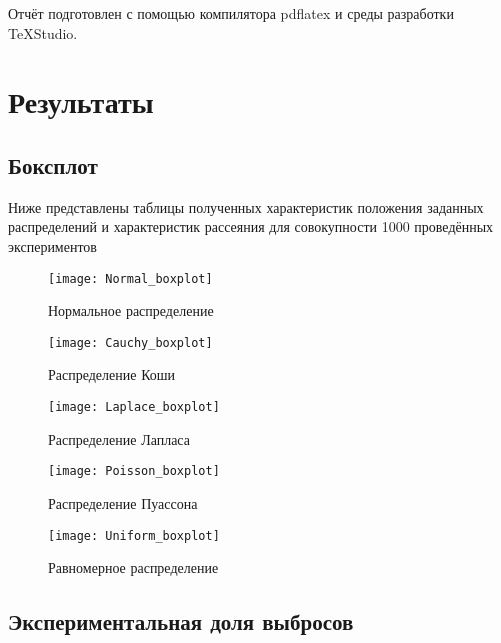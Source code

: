 Отчёт подготовлен с помощью компилятора pdflatex и среды разработки TeXStudio.

\section{Результаты}
\subsection{Боксплот}
Ниже представлены таблицы полученных характеристик положения заданных распределений и характеристик рассеяния для совокупности 1000 проведённых экспериментов

\begin{figure}[H]
	\begin{center}
		\texttt{[image: Normal\_boxplot]}
		\caption{Нормальное распределение}
		\label{pic:pic_name}
	\end{center}
\end{figure}


\begin{figure}[H]
	\begin{center}
		\texttt{[image: Cauchy\_boxplot]}
		\caption{Распределение Коши}
		\label{pic:pic_name}
	\end{center}
\end{figure}


\begin{figure}[H]
	\begin{center}
		\texttt{[image: Laplace\_boxplot]}
		\caption{Распределение Лапласа}
		\label{pic:pic_name}
	\end{center}
\end{figure}

\begin{figure}[H]
	\begin{center}
		\texttt{[image: Poisson\_boxplot]}
		\caption{Распределение Пуассона}
		\label{pic:pic_name}
	\end{center}
\end{figure}

\begin{figure}[H]
	\begin{center}
		\texttt{[image: Uniform\_boxplot]}
		\caption{Равномерное распределение}
		\label{pic:pic_name}
	\end{center}
\end{figure}

\subsection{Экспериментальная доля выбросов}

